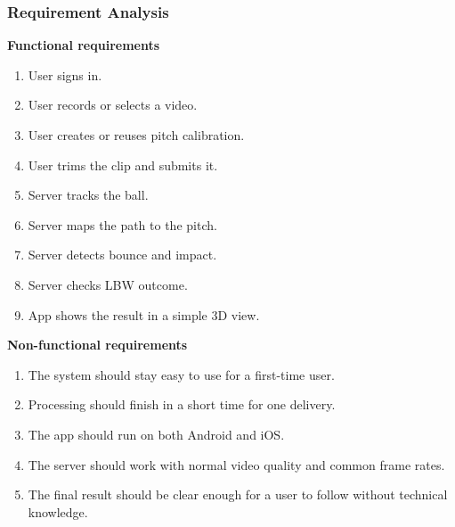 \documentclass[12pt,a4paper]{article}
\begin{document}
\subsubsection{Requirement Analysis}

\textbf{Functional requirements}

\begin{enumerate}
    \item User signs in.
    \item User records or selects a video.
    \item User creates or reuses pitch calibration.
    \item User trims the clip and submits it.
    \item Server tracks the ball.
    \item Server maps the path to the pitch.
    \item Server detects bounce and impact.
    \item Server checks LBW outcome.
    \item App shows the result in a simple 3D view.
\end{enumerate}

\textbf{Non-functional requirements}

\begin{enumerate}
    \item The system should stay easy to use for a first-time user.
    \item Processing should finish in a short time for one delivery.
    \item The app should run on both Android and iOS.
    \item The server should work with normal video quality and common frame rates.
    \item The final result should be clear enough for a user to follow without technical knowledge.
\end{enumerate}
\end{document}
